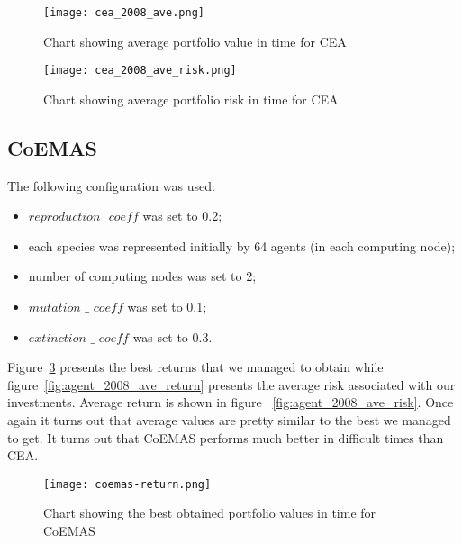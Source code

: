 \begin{figure}[ht]
  \begin{center}
    \texttt{[image: cea\_2008\_ave.png]}
  \end{center}
  \caption{Chart showing average portfolio value in time for CEA}
  \label{fig:cea_2008_ave}
\end{figure}

\begin{figure}[ht]
  \begin{center}
    \texttt{[image: cea\_2008\_ave\_risk.png]}
  \end{center}
  \caption{Chart showing average portfolio risk in time for CEA}
  \label{fig:co-evol-risk}
\end{figure}


\subsection{CoEMAS}

The following configuration was used:
\begin{itemize}
  \item $reproduction\_$ $coeff$ was set to 0.2;
  \item each species was represented initially by 64 agents (in each computing node);
  \item number of computing nodes was set to 2;
  \item $mutation$ $\_$ $coeff$ was set to 0.1;
  \item $extinction$ $\_$ $coeff$ was set to 0.3.
\end{itemize}

Figure~\ref{fig:agent_2008_best_return} presents the best returns that we managed to obtain
  while  figure~\ref{fig:agent_2008_ave_return} presents the average risk associated with our investments.
Average return is shown in figure ~\ref{fig:agent_2008_ave_risk}.
Once again it turns out that average values are pretty similar to the best we managed to get. 
It turns out that CoEMAS performs much better in difficult times than CEA.
 
\begin{figure}[ht]
  \begin{center}
    \texttt{[image: coemas-return.png]}
  \end{center}
  \caption{Chart showing the best obtained portfolio values in time for CoEMAS}
  \label{fig:agent_2008_best_return}
\end{figure}

